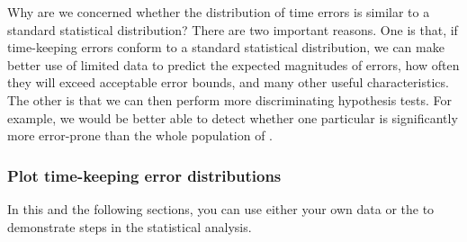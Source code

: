 Why are we concerned whether the distribution of time errors is similar to a standard statistical distribution? 
There are two important reasons. 
One is that, if time-keeping errors conform to a standard statistical distribution, we can make better use of limited data to predict the expected magnitudes of errors, how often they will exceed acceptable error bounds, and many other useful characteristics. 
The other is that we can then perform more discriminating hypothesis tests.
For example, we would be better able to detect whether one particular \rtc is significantly more error-prone than the whole population of \rtcs.


\subsubsection{\howto Plot time-keeping error distributions}
In this and the following sections, you can use either your own data or the  to demonstrate steps in the statistical analysis. 

